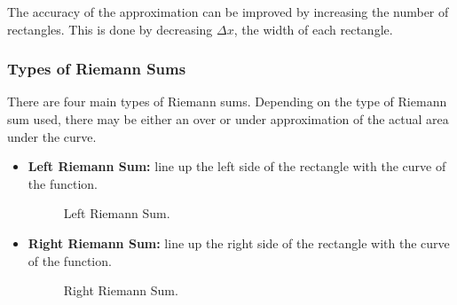 \documentclass[12pt]{article}
\begin{document}
The accuracy of the approximation can be improved by increasing the number of rectangles. This is done by decreasing $\Delta x$, the width of each rectangle.

\subsubsection{Types of Riemann Sums}
There are four main types of Riemann sums. Depending on the type of Riemann sum used, there may be either an over or under approximation of the actual area under the curve.
\begin{itemize}
	\item \textbf{Left Riemann Sum:} line up the left side of the rectangle with the curve of the function.
	\begin{figure}[H]
		\centering
		\caption{Left Riemann Sum.}
	\end{figure}

	\item \textbf{Right Riemann Sum:} line up the right side of the rectangle with the curve of the function.
	\begin{figure}[H]
		\centering
		\caption{Right Riemann Sum.}
	\end{figure}


\end{itemize}
\end{document}

